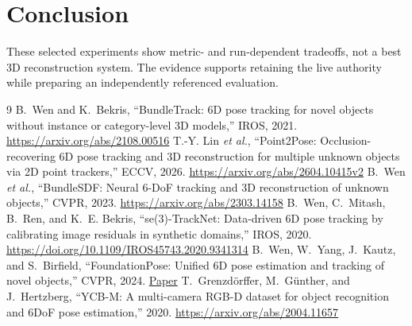 \documentclass[10pt,journal]{IEEEtran}
\begin{document}
\section{Conclusion}
These selected experiments show metric- and run-dependent tradeoffs, not a best 3D reconstruction system. The evidence supports retaining the live authority while preparing an independently referenced evaluation.

\begin{thebibliography}{9}
 B.~Wen and K.~Bekris, ``BundleTrack: 6D pose tracking for novel objects without instance or category-level 3D models,'' IROS, 2021. \url{https://arxiv.org/abs/2108.00516}
 T.-Y. Lin \emph{et al.}, ``Point2Pose: Occlusion-recovering 6D pose tracking and 3D reconstruction for multiple unknown objects via 2D point trackers,'' ECCV, 2026. \url{https://arxiv.org/abs/2604.10415v2}
 B.~Wen \emph{et al.}, ``BundleSDF: Neural 6-DoF tracking and 3D reconstruction of unknown objects,'' CVPR, 2023. \url{https://arxiv.org/abs/2303.14158}
 B.~Wen, C.~Mitash, B.~Ren, and K.~E. Bekris, ``se(3)-TrackNet: Data-driven 6D pose tracking by calibrating image residuals in synthetic domains,'' IROS, 2020. \url{https://doi.org/10.1109/IROS45743.2020.9341314}
 B.~Wen, W.~Yang, J.~Kautz, and S.~Birfield, ``FoundationPose: Unified 6D pose estimation and tracking of novel objects,'' CVPR, 2024. \href{https://openaccess.thecvf.com/content/CVPR2024/papers/Wen_FoundationPose_Unified_6D_Pose_Estimation_and_Tracking_of_Novel_Objects_CVPR_2024_paper.pdf}{Paper}
 T.~Grenzd\"orffer, M.~G\"unther, and J.~Hertzberg, ``YCB-M: A multi-camera RGB-D dataset for object recognition and 6DoF pose estimation,'' 2020. \url{https://arxiv.org/abs/2004.11657}
\end{thebibliography}
\end{document}
